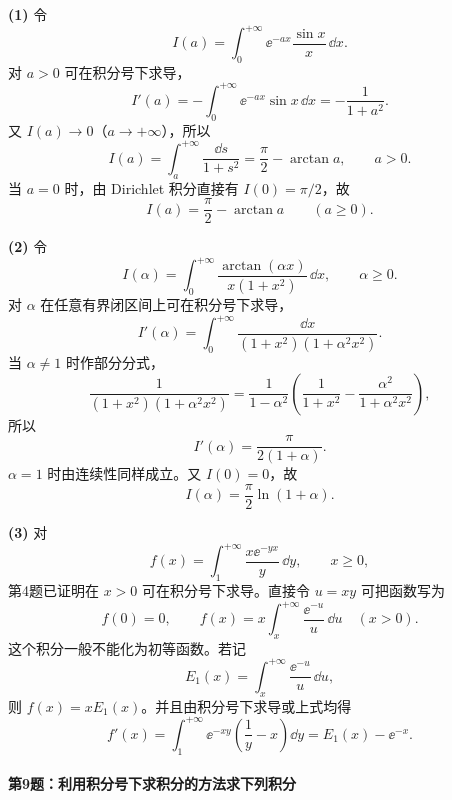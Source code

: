 \begin{xsolution}
\textbf{(1)} 令
\[
I(a)=\int_0^{+\infty}\ee^{-ax}\frac{\sin x}{x}\,\dd x.
\]
对 $a>0$ 可在积分号下求导，
\[
I'(a)=-\int_0^{+\infty}\ee^{-ax}\sin x\,\dd x=-\frac1{1+a^2}.
\]
又 $I(a)\to0$（$a\to+\infty$），所以
\[
I(a)=\int_a^{+\infty}\frac{\dd s}{1+s^2}
=\frac\pi2-\arctan a,
\qquad a>0.
\]
当 $a=0$ 时，由 Dirichlet 积分直接有 $I(0)=\pi/2$，故
\[
\boxed{I(a)=\frac\pi2-\arctan a\qquad(a\geqslant0)}.
\]

\textbf{(2)} 令
\[
I(\alpha)=\int_0^{+\infty}
\frac{\arctan(\alpha x)}{x(1+x^2)}\,\dd x,
\qquad \alpha\geqslant0.
\]
对 $\alpha$ 在任意有界闭区间上可在积分号下求导，
\[
I'(\alpha)=\int_0^{+\infty}
\frac{\dd x}{(1+x^2)(1+\alpha^2x^2)}.
\]
当 $\alpha\neq1$ 时作部分分式，
\[
\frac1{(1+x^2)(1+\alpha^2x^2)}
=\frac1{1-\alpha^2}\left(\frac1{1+x^2}-\frac{\alpha^2}{1+\alpha^2x^2}\right),
\]
所以
\[
I'(\alpha)=\frac\pi{2(1+\alpha)}.
\]
$\alpha=1$ 时由连续性同样成立。又 $I(0)=0$，故
\[
\boxed{I(\alpha)=\frac\pi2\ln(1+\alpha)}.
\]

\textbf{(3)} 对
\[
f(x)=\int_1^{+\infty}\frac{x\ee^{-yx}}y\,\dd y,
\qquad x\geqslant0,
\]
第4题已证明在 $x>0$ 可在积分号下求导。直接令 $u=xy$ 可把函数写为
\[
\boxed{
f(0)=0,
\qquad
f(x)=x\int_x^{+\infty}\frac{\ee^{-u}}u\,\dd u\quad(x>0).}
\]
这个积分一般不能化为初等函数。若记
\[
E_1(x)=\int_x^{+\infty}\frac{\ee^{-u}}u\,\dd u,
\]
则 $f(x)=xE_1(x)$。并且由积分号下求导或上式均得
\[
f'(x)=\int_1^{+\infty}\ee^{-xy}\left(\frac1y-x\right)\dd y
=E_1(x)-\ee^{-x}.
\]
\end{xsolution}

\paragraph{第9题：利用积分号下求积分的方法求下列积分}

